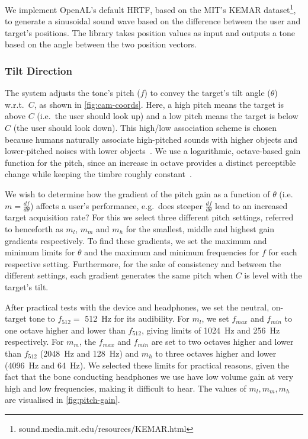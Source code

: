 \documentclass[sigconf, screen=true, anonymous=true]{acmart}
\begin{document}
We implement OpenAL's default HRTF, based on the MIT's KEMAR dataset\footnote{sound.media.mit.edu/resources/KEMAR.html}, to generate a sinusoidal sound wave based on the difference between the user and target's positions.
The library takes position values as input and outputs a tone based on the angle between the two position vectors. 

\subsubsection{Tilt Direction}

The system adjusts the tone's pitch ($f$) to convey the target's tilt angle ($\theta$) w.r.t.\ $C$, as shown in \cref{fig:cam-coords}. 
Here, a high pitch means the target is above $C$ (i.e.\ the user should look up) and a low pitch means the target is below $C$ (the user should look down).
This high/low association scheme is chosen because humans naturally associate high-pitched sounds with higher objects and lower-pitched noises with lower objects~\cite{pratt1930spatial, blauert1997spatial}.
We use a logarithmic, octave-based gain function for the pitch, since an increase in octave provides a distinct perceptible change while keeping the timbre roughly constant~\cite{shepard1964circularity}.

We wish to determine how the gradient of the pitch gain as a function of $\theta$ (i.e.\ $m = \frac{df}{d\theta}$) affects a user's performance, e.g.\ does steeper $\frac{df}{d\theta}$ lead to an increased target acquisition rate?
For this we select three different pitch settings, referred to henceforth as $m_l$, $m_m$ and $m_h$ for the smallest, middle and highest gain gradients respectively. 
To find these gradients, we set the maximum and minimum limits for $\theta$ and the maximum and minimum frequencies for $f$ for each respective setting.
Furthermore, for the sake of consistency and between the different settings, each gradient generates the same pitch when $C$ is level with the target's tilt. 

After practical tests with the device and headphones, we set the neutral, on-target tone to $f_{512} =$ \SI{512}{\hertz} for its audibility.
For $m_l$, we set $f_{max}$ and $f_{min}$ to one octave higher and lower than $f_{512}$, giving limits of \SI{1024}{\hertz} and \SI{256}{\hertz} respectively.
For $m_m$, the $f_{max}$ and $f_{min}$ are set to two octaves higher and lower than $f_{512}$ (\SI{2048}{\hertz} and \SI{128}{\hertz}) and $m_h$ to three octaves higher and lower (\SI{4096}{\hertz} and \SI{64}{\hertz}).
We selected these limits for practical reasons, given the fact that the bone conducting headphones we use have low volume gain at very high and low frequencies, making it difficult to hear. 
The values of $m_l, m_m, m_h$ are visualised in \cref{fig:pitch-gain}.
\end{document}
